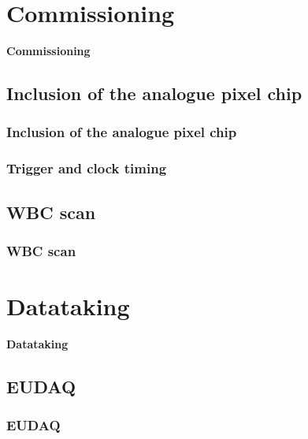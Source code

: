 \documentclass[9pt]{beamer}
\begin{document}
\section{Commissioning}
\begin{frame}
	\begin{alertblock}{
		\begin{center}
			\Large{\textbf{Commissioning}}
		\end{center}}
	\end{alertblock}
\end{frame}
\subsection{Inclusion of the analogue pixel chip}
\begin{frame}
	\frametitle{Inclusion of the analogue pixel chip}
\end{frame}
\begin{frame}
	\frametitle{Trigger and clock timing}
\end{frame}
\subsection{WBC scan}
\begin{frame}
	\frametitle{WBC scan}
\end{frame}
\section{Datataking}
\begin{frame}
	\begin{alertblock}{
		\begin{center}
			\Large{\textbf{Datataking}}
		\end{center}}
	\end{alertblock}
\end{frame}
\subsection{EUDAQ}
\begin{frame}
	\frametitle{EUDAQ}
\end{frame}
\end{document}
